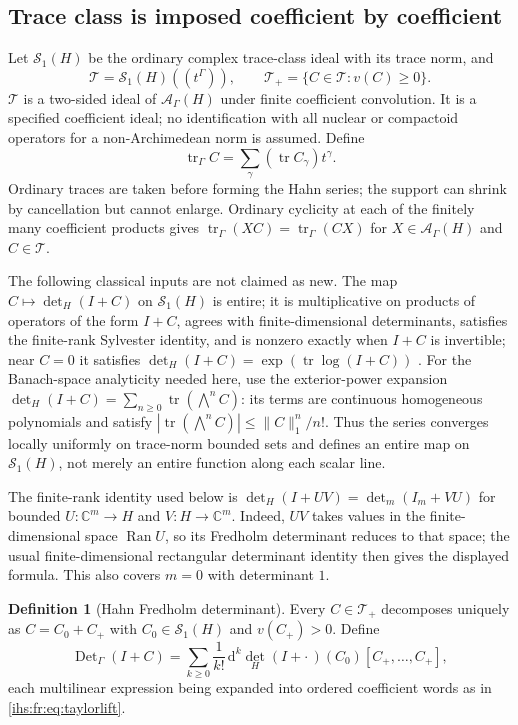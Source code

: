 \documentclass[11pt,a4paper]{article}
\numberwithin{equation}{section}
\theoremstyle{definition}
\newtheorem{definition}[definition]{Definition}
\theoremstyle{remark}
\newcommand{\C}{\mathbb C}
\newcommand{\Ahh}{\mathcal A_\Gamma(H)}
\newcommand{\Ran}{\operatorname{Ran}}
\newcommand{\norm}[1]{\lVert#1\rVert}
\newcommand{\Tr}{\operatorname{tr}}
\newcommand{\Det}{\operatorname{Det}_\Gamma}
\newcommand{\TT}{\mathscr T}
\newcommand{\SH}{\mathcal S_1(H)}
\begin{document}
\subsection{Trace class is imposed coefficient by coefficient}\label{ihs:fr:sec:traceclass}
Let $\SH$ be the ordinary complex trace-class ideal with its trace norm, and
\[
 \TT=\SH((t^\Gamma)),\qquad \TT_+=\{C\in\TT:v(C)\ge0\}.
\]
$\TT$ is a two-sided ideal of $\Ahh$ under finite coefficient convolution. It
is a specified coefficient ideal; no identification with all nuclear or
compactoid operators for a non-Archimedean norm is assumed. Define
\begin{equation}\label{ihs:fr:eq:hahntrace}
 \Tr_\Gamma C=\sum_\gamma(\Tr C_\gamma)t^\gamma.
\end{equation}
Ordinary traces are taken before forming the Hahn series; the support can
shrink by cancellation but cannot enlarge. Ordinary cyclicity at each of the
finitely many coefficient products gives
$\Tr_\Gamma(XC)=\Tr_\Gamma(CX)$ for $X\in\Ahh$ and $C\in\TT$.

The following classical inputs are not claimed as new. The map
$C\mapsto\det_H(I+C)$ on $\SH$ is entire; it is multiplicative on products of
operators of the form $I+C$, agrees with finite-dimensional determinants,
satisfies the finite-rank Sylvester identity, and is nonzero exactly when
$I+C$ is invertible; near $C=0$ it satisfies
$\det_H(I+C)=\exp(\Tr\log(I+C))$ \cite[Section~3]{Bornemann}.
For the Banach-space analyticity needed here, use the exterior-power
expansion $\det_H(I+C)=\sum_{n\ge0}\Tr(\bigwedge^n C)$: its terms are
continuous homogeneous polynomials and satisfy
$|\Tr(\bigwedge^n C)|\le\norm C_1^n/n!$. Thus the series converges locally
uniformly on trace-norm bounded sets and defines an entire map on $\SH$,
not merely an entire function along each scalar line.

The finite-rank identity used below is
$\det_H(I+UV)=\det_m(I_m+VU)$ for bounded $U:\C^m\to H$ and
$V:H\to\C^m$. Indeed, $UV$ takes values in the finite-dimensional space
$\Ran U$, so its Fredholm determinant reduces to that space; the usual
finite-dimensional rectangular determinant identity then gives the displayed
formula. This also covers $m=0$ with determinant $1$.

\begin{definition}[Hahn Fredholm determinant]\label{ihs:fr:def:determinant}
Every $C\in\TT_+$ decomposes uniquely as $C=C_0+C_+$ with $C_0\in\SH$ and
$v(C_+)>0$. Define
\begin{equation}\label{ihs:fr:eq:hahndet}
 \Det(I+C)=\sum_{k\ge0}\frac1{k!}\,\mathrm d^k{\det}_H(I+\cdot\,)(C_0)[C_+,\ldots,C_+],
\end{equation}
each multilinear expression being expanded into ordered coefficient words as
in \eqref{ihs:fr:eq:taylorlift}.
\end{definition}
\end{document}
